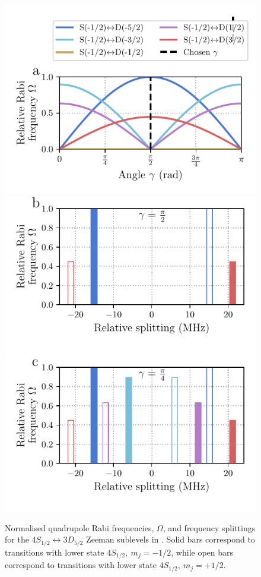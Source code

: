    \begin{figure}
        \vspace*{-0.5cm}
        \begin{center}
        \noindent\includegraphics[width=0.65\linewidth]{
            figures/pdf_figure/qp_gamma.pdf
            }
        \vspace*{-0.5cm}
        \noindent\includegraphics[width=0.65\linewidth]{
            figures/pdf_figure/qp_transition_spectrum_0.50.pdf
            }
        \vspace*{-0.5cm}
        \noindent\includegraphics[width=0.65\linewidth]{
            figures/pdf_figure/qp_transition_spectrum_0.25.pdf
            }
        \end{center}
        \vspace*{-0.5cm}
        \caption{
            Normalised quadrupole Rabi frequencies, $\Omega$, and frequency splittings for the $4S_{1/2} \leftrightarrow 3D_{5/2}$ Zeeman sublevels in \ca. Solid bars correspond to transitions with lower state $4S_{1/2},~m_j = -1/2$, while open bars correspond to transitions with lower state $4S_{1/2},~m_j = +1/2$.
}
\end{figure}
